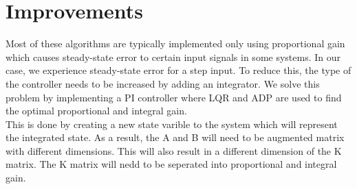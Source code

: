 \section{Improvements}
Most of these algorithms are typically implemented only using proportional gain which causes steady-state error to certain input signals in some systems.  In our case, we experience steady-state error for a step input.  To reduce this, the type of the controller needs to be increased by adding an integrator.  We solve this problem by implementing a PI controller where LQR and ADP are used to find the optimal proportional and integral gain.\\
This is done by creating a new state varible to the system which will represent the integrated state.   As a result, the A and B will need to be augmented matrix with different dimensions.  This will also result in a different dimension of the K matrix.  The K matrix will nedd to be seperated into proportional and integral gain.




